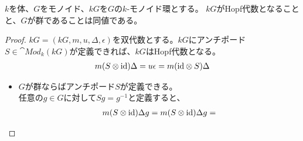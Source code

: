 {	\begin{proposition}[モノイド環のHopf代数]\label{prop:モノイド環のHopf代数} %
		$k$を体、$G$をモノイド、$kG$を$G$の$k$-モノイド環とする。
		$kG$がHopf代数となることと、$G$が群であることは同値である。
	\end{proposition} %
	\begin{proof} %
		$kG=(kG,m,u,\Delta,\epsilon)$を双代数とする。$kG$にアンチポード
		$S\in\cat{Mod}_k(kG)$が定義できれば、$kG$はHopf代数となる。
		\begin{equation*}\begin{split}
			m(S\otimes{\ensuremath{\operatorname{id}}})\Delta = u\epsilon = m({\operatorname{id}}\otimes S)\Delta
		\end{split}\end{equation*}
		\begin{itemize}\setlength{\itemsep}{-1mm} %
			\item $G$が群ならばアンチポード$S$が定義できる。\\
			任意の$g\in G$に対して$Sg=g^{-1}$と定義すると、
			\begin{equation*}\begin{split}
				m(S\otimes{\ensuremath{\operatorname{id}}})\Delta g = m(S\otimes{\ensuremath{\operatorname{id}}})\Delta g = 
			\end{split}\end{equation*}
		\end{itemize} %
	\end{proof} %
}
